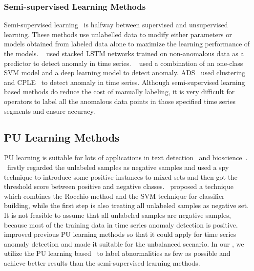 \subsubsection{Semi-supervised Learning Methods}
Semi-supervised learning~\cite{zhou2014semi} is halfway between supervised and unsupervised learning. These methods use unlabelled data to modify either parameters or models obtained from labeled data alone to maximize the learning performance of the models. ~\cite{Malhotra2015LongST} used stacked LSTM networks trained on non-anomalous data as a predictor to detect anomaly in time series. ~\cite{HighDimensional} used a combination of an one-class SVM model and a deep learning model to detect anomaly. ADS~\cite{ADSarticle} used clustering and CPLE~\cite{loog2016contrastive} to detect anomaly in time series. Although semi-supervised learning based methods do reduce the cost of manually labeling, it is very difficult for operators to label all the anomalous data points in those specified time series segments and ensure accuracy.

\subsection{PU Learning Methods}
\label{subsec:pu}
PU learning is suitable for lots of applications in text detection~\cite{Li2014SpottingFR, Liu2002PartiallySC, putranditional2003, ren-etal-2014-positive} and  bioscience~\cite{Mordelet_2011, Yang2014EnsemblePU}. ~\cite{putranditional2003}firstly regarded the unlabeled samples as negative samples and used a spy technique to introduce some positive instances to mixed sets and then got the threshold score between positive and negative classes.  ~\cite{Liu2002PartiallySC}proposed a technique which combines the Rocchio method and the SVM technique for classifier building, while the first step is also treating all unlabeled samples as negative set. 
It is not feasible to assume that all unlabeled samples are negative samples, because most of the training data in time series anomaly detection is positive. ~\cite{PUlearning2017} improved previous PU learning methods so that it could apply for time series anomaly detection and made it suitable for the unbalanced scenario. In our \name{}, we utilize the PU learning based~\cite{PUlearning2017} to label abnormalities as few as possible and achieve better results than the semi-supervised learning methods.

